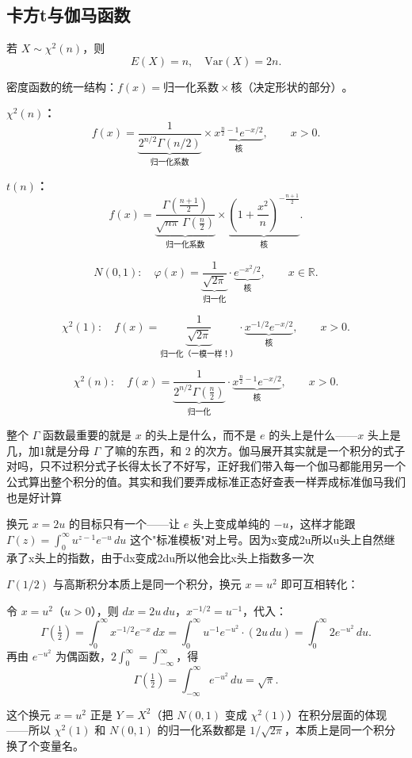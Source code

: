 \subsection{卡方t与伽马函数}
\begin{dxtips}
    若 $X \sim \chi^2(n)$，则
\begin{equation*}
    E(X) = n, \quad \text{Var}(X) = 2n.
\end{equation*}
\end{dxtips}
\begin{note}
密度函数的统一结构：\(f(x)=\text{归一化系数}\times\text{核（决定形状的部分）}\)。

\textbf{$\chi^2(n)$：}
\[
f(x)=\underbrace{\frac{1}{2^{n/2}\Gamma(n/2)}}_{\text{归一化系数}}
\times
\underbrace{x^{\frac n2-1}e^{-x/2}}_{\text{核}},
\qquad x>0.
\]

\textbf{$t(n)$：}
\[
f(x)=\underbrace{\frac{\Gamma\!\left(\frac{n+1}{2}\right)}{\sqrt{n\pi}\,\Gamma\!\left(\frac n2\right)}}_{\text{归一化系数}}
\times
\underbrace{\left(1+\frac{x^2}{n}\right)^{-\frac{n+1}{2}}}_{\text{核}}.
\]
\end{note}
\begin{note}
\[
N(0,1):\quad \varphi(x)=\underbrace{\frac{1}{\sqrt{2\pi}}}_{\text{归一化}}\cdot\underbrace{e^{-x^2/2}}_{\text{核}},
\qquad x\in\mathbb{R}.
\]

\[
\chi^2(1):\quad f(x)=\underbrace{\frac{1}{\sqrt{2\pi}}}_{\text{归一化（一模一样！）}}\cdot\underbrace{x^{-1/2}e^{-x/2}}_{\text{核}},
\qquad x>0.
\]

\[
\chi^2(n):\quad f(x)=\underbrace{\frac{1}{2^{n/2}\Gamma(\frac n2)}}_{\text{归一化}}\cdot\underbrace{x^{\frac n2-1}e^{-x/2}}_{\text{核}},
\qquad x>0.
\]
\end{note}
\begin{dxtips}
整个 \(\Gamma\) 函数最重要的就是 \(x\) 的头上是什么，而不是 \(e\) 的头上是什么——\(x\) 头上是几，加1就是分母 \(\Gamma\) 了嘛的东西，和 \(2\) 的次方。伽马展开其实就是一个积分的式子对吗，只不过积分式子长得太长了不好写，正好我们带入每一个伽马都能用另一个公式算出整个积分的值。其实和我们要弄成标准正态好查表一样弄成标准伽马我们也是好计算
\end{dxtips}
\begin{dxtips}
换元 \(x=2u\) 的目标只有一个——让 \(e\) 头上变成单纯的 \(-u\)，这样才能跟 \(\Gamma(z)=\displaystyle\int_0^\infty u^{z-1}e^{-u}\,du\) 这个"标准模板"对上号。因为x变成2u所以u头上自然继承了x头上的指数，由于dx变成2du所以他会比x头上指数多一次
\end{dxtips}
\begin{dxtips}
\(\Gamma(1/2)\) 与高斯积分本质上是同一个积分，换元 \(x=u^2\) 即可互相转化：

令 \(x=u^2\)（\(u>0\)），则 \(dx=2u\,du\)，\(x^{-1/2}=u^{-1}\)，代入：
\[
\Gamma\!\left(\tfrac12\right)=\int_0^\infty x^{-1/2}e^{-x}\,dx
=\int_0^\infty u^{-1}e^{-u^2}\cdot(2u\,du)
=\int_0^\infty 2e^{-u^2}\,du.
\]
再由 \(e^{-u^2}\) 为偶函数，\(2\int_0^\infty=\int_{-\infty}^{\infty}\)，得
\[
\Gamma\!\left(\tfrac12\right)=\int_{-\infty}^{\infty}e^{-u^2}\,du=\sqrt\pi.
\]

这个换元 \(x=u^2\) 正是 \(Y=X^2\)（把 \(N(0,1)\) 变成 \(\chi^2(1)\)）在积分层面的体现——所以 \(\chi^2(1)\) 和 \(N(0,1)\) 的归一化系数都是 \(1/\sqrt{2\pi}\)，本质上是同一个积分换了个变量名。
\end{dxtips}
